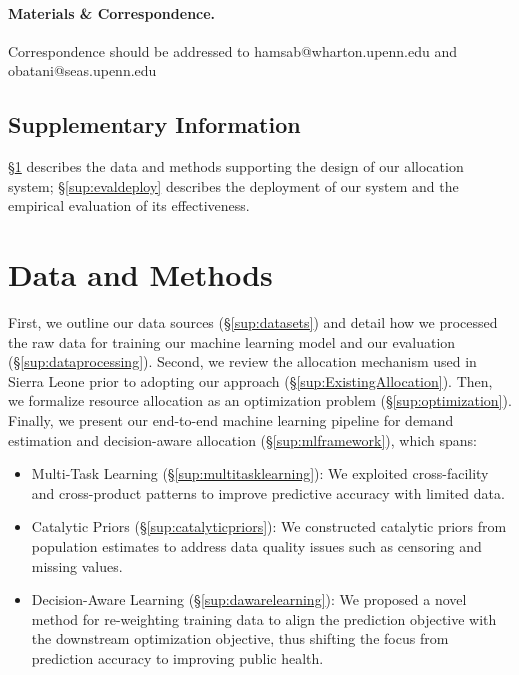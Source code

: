 \documentclass[12pt]{article}
\begin{document}
\paragraph*{Materials \& Correspondence.}  Correspondence should be addressed to hamsab@wharton.upenn.edu and obatani@seas.upenn.edu





















\newpage
\setcounter{section}{0}
\setcounter{page}{1}

\setcounter{figure}{0}
\renewcommand{\thefigure}{SI~\arabic{figure}}

\setcounter{table}{0}
\renewcommand{\thetable}{SI~\arabic{table}}

\begin{center}
\section*{Supplementary Information}
\end{center}

\S\ref{sup:one} describes the data and methods supporting the design of our allocation system; \S\ref{sup:evaldeploy} describes the deployment of our system and the empirical evaluation of its effectiveness.

\section{Data and Methods}
\label{sup:one}

First, we outline our data sources (\S\ref{sup:datasets}) and detail how we processed the raw data for training our machine learning model and our evaluation (\S\ref{sup:dataprocessing}). Second, we review the allocation mechanism used in Sierra Leone prior to adopting our approach (\S\ref{sup:ExistingAllocation}). Then, we formalize resource allocation as an optimization problem (\S\ref{sup:optimization}). Finally, we present our end-to-end machine learning pipeline for demand estimation and decision-aware allocation (\S\ref{sup:mlframework}), which spans:
\begin{itemize}
\item Multi-Task Learning (\S\ref{sup:multitasklearning}): We exploited cross-facility and cross-product patterns to improve predictive accuracy with limited data.
\item Catalytic Priors (\S\ref{sup:catalyticpriors}): We constructed catalytic priors from population estimates to address data quality issues such as censoring and missing values.
\item Decision-Aware Learning (\S\ref{sup:dawarelearning}): We proposed a novel method for re-weighting training data to align the prediction objective with the downstream optimization objective, thus shifting the focus from prediction accuracy to improving public health.
\end{itemize}
\end{document}
